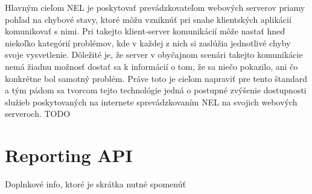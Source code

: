 Hlavným cieľom NEL je poskytovať prevádzkovateľom webových serverov priamy pohľad na chybové stavy, ktoré môžu vzniknúť pri snahe klientských aplikácií komunikovať s nimi. Pri takejto klient-server komunikácií môže nastať hneď niekoľko kategórií problémov, kde v každej z nich si zaslúžia jednotlivé chyby svoje vysvetlenie. Dôležité je, že server v obyčajnom scenári takejto komunikácie nemá žiadnu možnosť dostať sa k informácií o tom, že sa niečo pokazilo, ani čo konkrétne bol samotný problém. Práve toto je cieľom napraviť pre tento štandard a tým pádom sa tvorcom tejto technológie jedná o postupné zvýšenie dostupnosti služieb poskytovaných na internete sprevádzkovaním NEL na svojich webových serveroch. \color{red} TODO \color{black}

\subsection{}



\cite{W3C-NEL}









\section{Reporting API}

Doplnkové info, ktoré je skrátka nutné spomenúť \cite{W3C-reporting-api}
